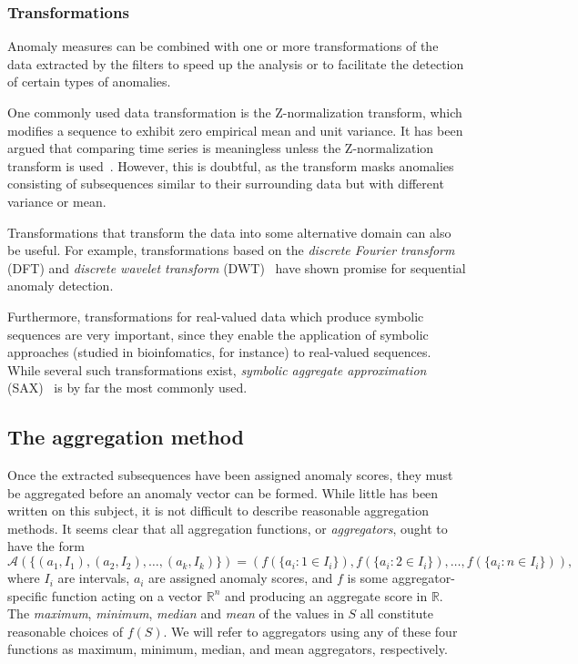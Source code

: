 \subsubsection{Transformations}
Anomaly measures can be combined with one or more transformations of the data extracted by the filters to speed up the analysis or to facilitate the detection of certain types of anomalies.

One commonly used data transformation is the Z-normalization transform, which modifies a sequence to exhibit zero empirical mean and unit variance. It has been argued that comparing time series is meaningless unless the Z-normalization transform is used~\cite{keogh5}. However, this is doubtful, as the transform masks anomalies consisting of subsequences similar to their surrounding data but with different variance or mean.

Transformations that transform the data into some alternative domain can also be useful. For example, transformations based on the \emph{discrete Fourier transform} (DFT) and \emph{discrete wavelet transform} (DWT)~\cite{fu} have shown promise for sequential anomaly detection.

Furthermore, transformations for real-valued data which produce symbolic sequences are very important, since they enable the application of symbolic approaches (studied in bioinfomatics, for instance) to real-valued sequences. While several such transformations exist, \emph{symbolic aggregate approximation} (SAX)~\cite{sax} is by far the most commonly used.

\subsection{The aggregation method}
\label{sect:aggregation_method}

Once the extracted subsequences have been assigned anomaly scores, they must be aggregated before an anomaly vector can be formed. While little has been written on this subject, it is not difficult to describe reasonable aggregation methods. It seems clear that all aggregation functions, or \emph{aggregators}, ought to have the form
\[
    \mathcal{A}(\{(a_1, I_1), (a_2, I_2), \dots, (a_k, I_k) \}) = (f(\{a_i: 1 \in I_i\}), f(\{a_i: 2 \in I_i\}), \dots, f(\{a_i: n \in I_i\})),
\]
where $I_i$ are intervals, $a_i$ are assigned anomaly scores, and $f$ is some aggregator-specific function acting on a vector $\mathbb{R}^n$ and producing an aggregate score in $\mathbb{R}$. The \emph{maximum}, \emph{minimum}, \emph{median} and \emph{mean} of the values in $S$ all constitute reasonable choices of $f(S)$. We will refer to aggregators using any of these four functions as maximum, minimum, median, and mean aggregators, respectively.
